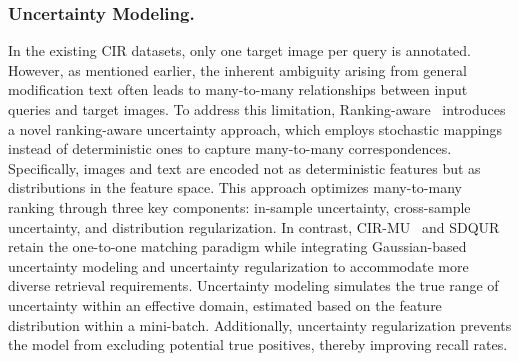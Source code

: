 \subsubsection{Uncertainty Modeling.} 
In the existing CIR datasets, only one target image per query is annotated. However, as mentioned earlier, the inherent ambiguity arising from general modification text often leads to many-to-many relationships between input queries and target images. To address this limitation, Ranking-aware~\cite{chen2023ranking} introduces a novel ranking-aware uncertainty approach, which employs stochastic mappings instead of deterministic ones to capture many-to-many correspondences. Specifically, images and text are encoded not as deterministic features but as distributions in the feature space. This approach optimizes many-to-many ranking through three key components: in-sample uncertainty, cross-sample uncertainty, and distribution regularization.
In contrast, CIR-MU~\cite{chen2022mu} and SDQUR~\cite{xu2024SDQUR} retain the one-to-one matching paradigm while integrating Gaussian-based uncertainty modeling and uncertainty regularization to accommodate more diverse retrieval requirements. Uncertainty modeling simulates the true range of uncertainty within an effective domain, estimated based on the feature distribution within a mini-batch. Additionally, uncertainty regularization prevents the model from excluding potential true positives, thereby improving recall rates.


